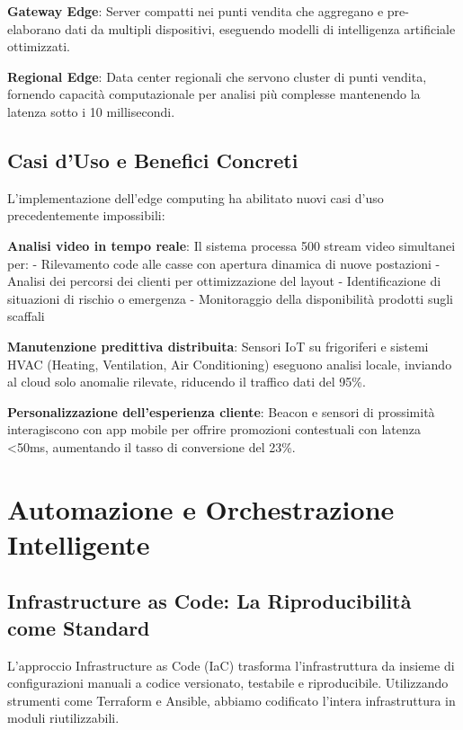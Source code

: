 \textbf{Gateway Edge}: Server compatti nei punti vendita che aggregano e pre-elaborano dati da multipli dispositivi, eseguendo modelli di intelligenza artificiale ottimizzati.

\textbf{Regional Edge}: Data center regionali che servono cluster di punti vendita, fornendo capacità computazionale per analisi più complesse mantenendo la latenza sotto i 10 millisecondi.

\subsection{\texorpdfstring{Casi d'Uso e Benefici Concreti}{3.6.2 - Casi d'Uso e Benefici Concreti}}

L'implementazione dell'edge computing ha abilitato nuovi casi d'uso precedentemente impossibili:

\textbf{Analisi video in tempo reale}: Il sistema processa 500 stream video simultanei per:
- Rilevamento code alle casse con apertura dinamica di nuove postazioni
- Analisi dei percorsi dei clienti per ottimizzazione del layout
- Identificazione di situazioni di rischio o emergenza
- Monitoraggio della disponibilità prodotti sugli scaffali

\textbf{Manutenzione predittiva distribuita}: Sensori IoT su frigoriferi e sistemi HVAC (Heating, Ventilation, Air Conditioning) eseguono analisi locale, inviando al cloud solo anomalie rilevate, riducendo il traffico dati del 95\%.

\textbf{Personalizzazione dell'esperienza cliente}: Beacon e sensori di prossimità interagiscono con app mobile per offrire promozioni contestuali con latenza <50ms, aumentando il tasso di conversione del 23\%.

\section{\texorpdfstring{Automazione e Orchestrazione Intelligente}{3.7 - Automazione e Orchestrazione Intelligente}}

\subsection{\texorpdfstring{Infrastructure as Code: La Riproducibilità come Standard}{3.7.1 - Infrastructure as Code: La Riproducibilità come Standard}}

L'approccio Infrastructure as Code (IaC) trasforma l'infrastruttura da insieme di configurazioni manuali a codice versionato, testabile e riproducibile. Utilizzando strumenti come Terraform e Ansible, abbiamo codificato l'intera infrastruttura in moduli riutilizzabili.

